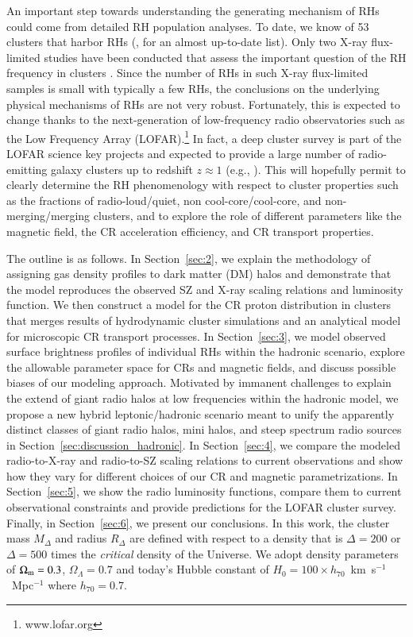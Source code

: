 \documentclass[useAMS,usenatbib]{mn2e}
\begin{document}
An important step towards understanding the generating mechanism of RHs could
come from detailed RH population analyses. To date, we know of 53 clusters that
harbor RHs (\citealp{2012A&ARv..20...54F}, for an almost up-to-date list). Only
two X-ray flux-limited studies have been conducted that assess the important
question of the RH frequency in clusters \citep{1999NewA....4..141G,
  VenturiGMRT_2}. Since the number of RHs in such X-ray flux-limited samples is
small with typically a few RHs, the conclusions on the underlying physical
mechanisms of RHs are not very robust. Fortunately, this is expected to change
thanks to the next-generation of low-frequency radio observatories such as the
Low Frequency Array (LOFAR).\footnote{www.lofar.org} In fact, a deep cluster
survey is part of the LOFAR science key projects and expected to provide a large
number of radio-emitting galaxy clusters up to redshift $z\approx1$ (e.g.,
\citealp{2010A&A...509A..68C,2012JApA..tmp...34R}). This will hopefully permit
to clearly determine the RH phenomenology with respect to cluster properties
such as the fractions of radio-loud/quiet, non cool-core/cool-core, and
non-merging/merging clusters, and to explore the role of different parameters
like the magnetic field, the CR acceleration efficiency, and CR transport
properties.

The outline is as follows. In Section~\ref{sec:2}, we explain the methodology of
assigning gas density profiles to dark matter (DM) halos and demonstrate that
the model reproduces the observed SZ and X-ray scaling relations and luminosity
function.  We then construct a model for the CR proton distribution in clusters
that merges results of hydrodynamic cluster simulations and an analytical model
for microscopic CR transport processes. In Section~\ref{sec:3}, we model
observed surface brightness profiles of individual RHs within the hadronic
scenario, explore the allowable parameter space for CRs and magnetic fields, and
discuss possible biases of our modeling approach.  Motivated by immanent
challenges to explain the extend of giant radio halos at low frequencies within
the hadronic model, we propose a new hybrid leptonic/hadronic scenario meant to
unify the apparently distinct classes of giant radio halos, mini halos, and
steep spectrum radio sources in Section~\ref{sec:discussion_hadronic}.  In
Section~\ref{sec:4}, we compare the modeled radio-to-X-ray and radio-to-SZ
scaling relations to current observations and show how they vary for different
choices of our CR and magnetic parametrizations. In Section~\ref{sec:5}, we show
the radio luminosity functions, compare them to current observational
constraints and provide predictions for the LOFAR cluster survey. Finally, in
Section~\ref{sec:6}, we present our conclusions. In this work, the cluster mass
$M_{\Delta}$ and radius $R_{\Delta}$ are defined with respect to a density that
is $\Delta=200$ or $\Delta=500$ times the \emph{critical} density of the
Universe. We adopt density parameters of $\Omega_{{\mathrm{m}}}=0.3$,
$\Omega_{\Lambda}=0.7$ and today's Hubble constant of $H_0 = 100 \times
h_{70}$~km~s$^{-1}$~Mpc$^{-1}$ where $h_{70} = 0.7$.
\end{document}
